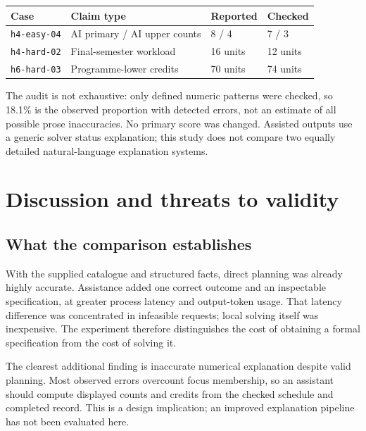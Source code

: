 \documentclass[11pt,a4paper]{article}
\newcommand{\code}[1]{\texttt{#1}}
\begin{document}
\begin{center}
\begin{minipage}{\linewidth}
\centering
{}
\label{tab:explanations}
\begin{tabularx}{\linewidth}{@{}lYll@{}}
\toprule
Case & Claim type & Reported & Checked\\
\midrule
\code{h4-easy-04} & AI primary / AI upper counts & 8 / 4 & 7 / 3\\
\code{h4-hard-02} & Final-semester workload & 16 units & 12 units\\
\code{h6-hard-03} & Programme-lower credits & 70 units & 74 units\\
\bottomrule
\end{tabularx}
\end{minipage}
\end{center}

The audit is not exhaustive: only defined numeric patterns were checked, so
18.1\% is the observed proportion with detected errors, not an estimate of all
possible prose inaccuracies. No primary score was changed. Assisted outputs
use a generic solver status explanation; this study does not compare two
equally detailed natural-language explanation systems.

\par
\section{Discussion and threats to validity}
\subsection{What the comparison establishes}
With the supplied catalogue and structured facts, direct planning was
already highly accurate. Assistance added one correct outcome and an
inspectable specification, at greater process latency and output-token
usage. That latency difference was concentrated in infeasible requests;
local solving itself was inexpensive. The experiment therefore distinguishes
the cost of obtaining a formal specification from the cost of solving it.

The clearest additional finding is inaccurate numerical explanation
despite valid planning. Most observed errors overcount focus membership,
so an assistant should compute displayed counts and credits from the
checked schedule and completed record. This is a design implication;
an improved explanation pipeline has not been evaluated here.
\end{document}
